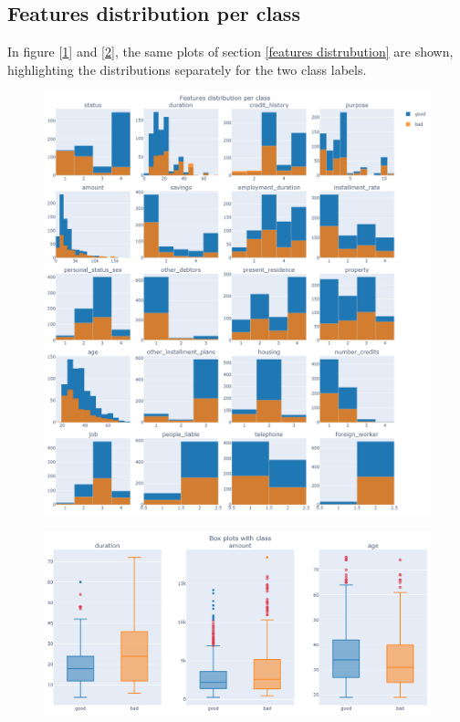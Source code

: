 \documentclass[letterpaper]{article}
\begin{document}
	\subsection{Features distribution per class}
	In figure [\ref{fig:4}] and [\ref{fig:5}], the same plots of section \ref{features distrubution} are shown, highlighting the distributions separately for the two class labels. 
	\begin{figure}[h]
		\centering
		\includegraphics[width=.8\textwidth]{images/distributions_by_class.png}
		\label{fig:4}
	\end{figure}
	\begin{figure}[h]
		\centering
		\includegraphics[width=.85\textwidth]{images/boxplots_with_classes.png}
		\label{fig:5}
	\end{figure}
	
\end{document}
